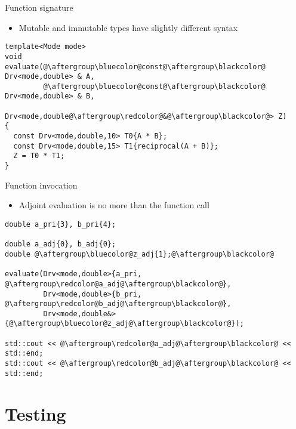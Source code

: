 \documentclass[xcolor=dvipsnames]{beamer}
\begin{document}
\begin{frame}[fragile]{Function signature}
\begin{itemize}
\item {\color{red}Mutable} and {\color{blue}immutable} types have slightly different syntax \vspace{2mm}
\end{itemize}
\begin{lstlisting}
template<Mode mode>
void
evaluate(@\aftergroup\bluecolor@const@\aftergroup\blackcolor@ Drv<mode,double> & A,
         @\aftergroup\bluecolor@const@\aftergroup\blackcolor@ Drv<mode,double> & B,
         Drv<mode,double@\aftergroup\redcolor@&@\aftergroup\blackcolor@> Z)
{
  const Drv<mode,double,10> T0{A * B};
  const Drv<mode,double,15> T1{reciprocal(A + B)};
  Z = T0 * T1;
}
\end{lstlisting}
\end{frame}


\begin{frame}[fragile]{Function invocation}
\begin{itemize}
\item Adjoint evaluation is no more than the function call \vspace{2mm}
\end{itemize}
\begin{lstlisting}
double a_pri{3}, b_pri{4};

double a_adj{0}, b_adj{0};
double @\aftergroup\bluecolor@z_adj{1};@\aftergroup\blackcolor@

evaluate(Drv<mode,double>{a_pri, @\aftergroup\redcolor@a_adj@\aftergroup\blackcolor@},
         Drv<mode,double>{b_pri, @\aftergroup\redcolor@b_adj@\aftergroup\blackcolor@},
         Drv<mode,double&>{@\aftergroup\bluecolor@z_adj@\aftergroup\blackcolor@});

std::cout << @\aftergroup\redcolor@a_adj@\aftergroup\blackcolor@ << std::end;
std::cout << @\aftergroup\redcolor@b_adj@\aftergroup\blackcolor@ << std::end;
\end{lstlisting}
\end{frame}


\section{Testing}
\end{document}
